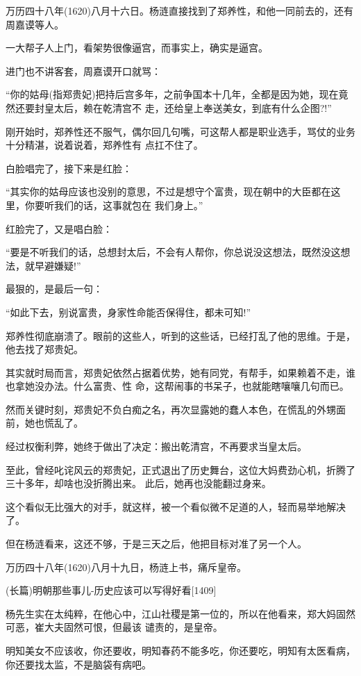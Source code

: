 \documentclass[11pt,a4paper,onecolumn]{article}
\begin{document}
万历四十八年(1620)八月十六日。杨涟直接找到了郑养性，和他一同前去的，还有周嘉谟等人。

一大帮子人上门，看架势很像逼宫，而事实上，确实是逼宫。

进门也不讲客套，周嘉谟开口就骂：

``你的姑母(指郑贵妃)把持后宫多年，之前争国本十几年，全都是因为她，现在竟然还要封皇太后，赖在乾清宫不
走，还给皇上奉送美女，到底有什么企图?!''

刚开始时，郑养性还不服气，偶尔回几句嘴，可这帮人都是职业选手，骂仗的业务十分精湛，说着说着，郑养性有
点扛不住了。

白脸唱完了，接下来是红脸：

``其实你的姑母应该也没别的意思，不过是想守个富贵，现在朝中的大臣都在这里，你要听我们的话，这事就包在
我们身上。''

红脸完了，又是唱白脸：

``要是不听我们的话，总想封太后，不会有人帮你，你总说没这想法，既然没这想法，就早避嫌疑!''

最狠的，是最后一句：

``如此下去，别说富贵，身家性命能否保得住，都未可知!''

郑养性彻底崩溃了。眼前的这些人，听到的这些话，已经打乱了他的思维。于是，他去找了郑贵妃。

其实就时局而言，郑贵妃依然占据着优势，她有同党，有帮手，如果赖着不走，谁也拿她没办法。什么富贵、性
命，这帮闹事的书呆子，也就能瞎嚷嚷几句而已。

然而关键时刻，郑贵妃不负白痴之名，再次显露她的蠢人本色，在慌乱的外甥面前，她也慌乱了。

经过权衡利弊，她终于做出了决定：搬出乾清宫，不再要求当皇太后。

至此，曾经叱诧风云的郑贵妃，正式退出了历史舞台，这位大妈费劲心机，折腾了三十多年，却啥也没折腾出来。
此后，她再也没能翻过身来。

这个看似无比强大的对手，就这样，被一个看似微不足道的人，轻而易举地解决了。

但在杨涟看来，这还不够，于是三天之后，他把目标对准了另一个人。

万历四十八年(1620)八月十九日，杨涟上书，痛斥皇帝。

(长篇)明朝那些事儿-历史应该可以写得好看$[$1409$]$

杨先生实在太纯粹，在他心中，江山社稷是第一位的，所以在他看来，郑大妈固然可恶，崔大夫固然可恨，但最该
谴责的，是皇帝。

明知美女不应该收，你还要收，明知春药不能多吃，你还要吃，明知有太医看病，你还要找太监，不是脑袋有病吧。
\end{document}
